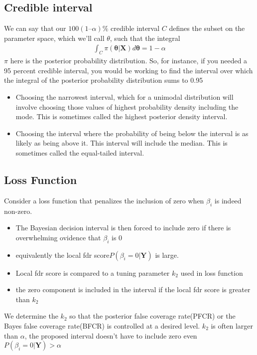 \documentclass[11pt]{article}
\begin{document}
\subsection{Credible interval}
We can say that our $100(1 – \alpha)\%$ credible interval $C$ defines the subset on the parameter space, which we’ll call $\theta$, such that the integral
\begin{align*}
\int_{C} \pi(\boldsymbol{\theta} | \boldsymbol{X}) d\boldsymbol{\theta} = 1 - \alpha
\end{align*}
$\pi$ here is the posterior probability distribution. So, for instance, if you needed a 95 percent credible interval, you would be working to find the interval over which the integral of the posterior probability distribution sums to 0.95

\begin{itemize}
	\item Choosing the narrowest interval, which for a unimodal distribution will involve choosing those values of highest probability density including the mode. This is sometimes called the highest posterior density interval.
	\item Choosing the interval where the probability of being below the interval is as likely as being above it. This interval will include the median. This is sometimes called the equal-tailed interval.
\end{itemize}

\subsection{Loss Function}
Consider a loss function that penalizes the inclusion of zero when $\beta_i$ is indeed non-zero. 
\begin{itemize}
	\item The Bayesian decision interval is then forced to include zero if there is overwhelming ovidence that  $\beta_i$ is 0
	\item equivalently the local fdr score$P(\beta_i =0 | \boldsymbol{Y})$ is large.
	\item Local fdr score is compared to a tuning parameter $k_2$ used in loss function
	\item the zero component is included in the interval if the local fdr score is greater than $k_2$
\end{itemize}
We determine the $k_2$ so that the posterior false coverage rate(PFCR) or the Bayes false coverage rate(BFCR) is controlled at a desired level. 
$k_2$ is often larger than $\alpha$, the proposed interval doesn't have to include zero even $ P(\beta_i =0 | \boldsymbol{Y}) > \alpha$
\end{document}
